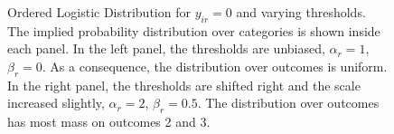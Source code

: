 \documentclass{article}
\newcommand{\DON}[1]{\todo[inline, color=white]{Don: {#1}}}
\newcommand{\Irater}{r}
\newcommand{\Iitem}{i}
\newcommand{\Incat}{c}
\newcommand{\ilogit}[1]{\text{logit}^{-1}\left(#1\right)}
\begin{document}
\begin{figure}[!ht]
\begin{subfigure}{.5\textwidth}
	\end{subfigure}
	\caption{Ordered Logistic Distribution for $y_{\Iitem\Irater} = 0$ and varying thresholds. The implied probability distribution over categories is shown inside each panel. In the left panel, the thresholds are unbiased, $\alpha_\Irater = 1$, $\beta_\Irater = 0$. As a consequence, the distribution over outcomes is uniform. In the right panel, the thresholds are shifted right and the scale increased slightly, $\alpha_\Irater = 2$, $\beta_\Irater = 0.5$. The distribution over outcomes has most mass on outcomes 2 and 3.}
	\label{fig:orderedLogistic}
\end{figure}
%
%
%
\end{document}
